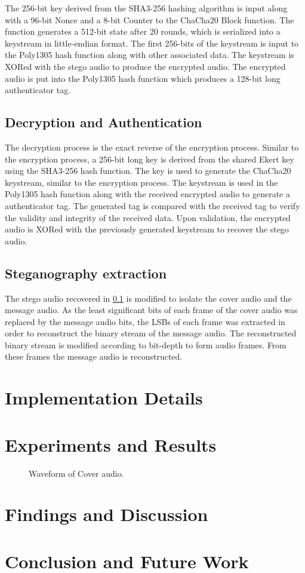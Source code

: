 \documentclass{article}
\begin{document}
The 256-bit key derived from the SHA3-256 hashing algorithm is input along with a 96-bit Nonce and a 8-bit Counter to the ChaCha20 Block function. The function generates a 512-bit state after 20 rounds, which is serialized into a keystream in little-endian format. The first 256-bits of the keystream is input to the Poly1305 hash function along with other associated data. The keystream is XORed with the stego audio to produce the encrypted audio. The encrypted audio is put into the Poly1305 hash function which produces a 128-bit long authenticator tag.
\subsection{Decryption and Authentication}
\label{sec:chacha20poly1305decryption}
The decryption process is the exact reverse of the encryption process. Similar to the encryption process, a 256-bit long key is derived from the shared Ekert key using the SHA3-256 hash function. The key is used to generate the ChaCha20 keystream, similar to the encryption process. The keystream is used in the Poly1305 hash function along with the received encrypted audio to generate a authenticator tag. The generated tag is compared with the received tag to verify the validity and integrity of the received data. Upon validation, the encrypted audio is XORed with the previously generated keystream to recover the stego audio.
\subsection{Steganography extraction}
The stego audio recovered in \ref{sec:chacha20poly1305decryption} is modified to isolate the cover audio and the message audio. As the least significant bits of each frame of the cover audio was replaced by the message audio bits, the LSBs of each frame was extracted in order to reconstruct the binary stream of the message audio. The reconstructed binary stream is modified according to bit-depth to form audio frames. From these frames the message audio is reconstructed.
\section{Implementation Details}
\label{sec:implementation}
\section{Experiments and Results}
\begin{figure}[!h]
    
    \caption{Waveform of Cover audio.}
\end{figure}
\label{sec:experminats}
\section{Findings and Discussion}
\label{sec:discussion}
\section{Conclusion and Future Work}
\label{sec:conclusion}



\end{document}
